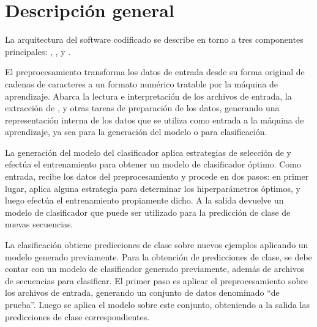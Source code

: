 %
%
%
\section{Descripción general}
%
La arquitectura del software codificado se describe en torno a
tres componentes principales: , , y . 

El preprocesamiento transforma los datos de entrada desde su forma
original de cadenas de caracteres a un formato numérico tratable por
la máquina de aprendizaje.
Abarca la lectura e interpretación de los archivos de entrada, la
extracción de , y otras tareas de preparación de los datos,
generando una representación interna de los datos que se utiliza como
entrada a la máquina de aprendizaje, ya sea para la generación del
modelo o para clasificación.

La generación del modelo del clasificador aplica estrategias de
selección de  y efectúa el entrenamiento
para obtener un modelo de clasificador óptimo.
Como entrada, recibe los datos del preprocesamiento y procede en dos
pasos: en primer lugar, aplica alguna estrategia para determinar los
hiperparámetros óptimos, y luego efectúa el entrenamiento propiamente
dicho.
A la salida devuelve un modelo de clasificador que puede ser
utilizado para la predicción de clase de nuevas secuencias.

La clasificación obtiene predicciones de clase sobre nuevos ejemplos
aplicando un modelo generado previamente.
Para la obtención de predicciones de clase, se debe contar con un
modelo de clasificador generado previamente, además de archivos de
secuencias para clasificar.
El primer paso es aplicar el preprocesamiento sobre los archivos de
entrada, generando un conjunto de datos denominado ``de prueba''.
Luego se aplica el modelo sobre este conjunto, obteniendo a la salida
las predicciones de clase correspondientes.


